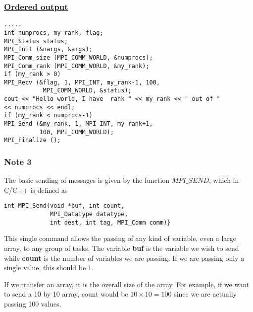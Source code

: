 \documentclass{beamer}
\begin{document}
\begin{frame}
\frametitle{\href{{https://github.com/CompPhysics/ComputationalPhysics2/blob/gh-pages/doc/Programs/LecturePrograms/programs/MPI/chapter07/program4.cpp}}{Ordered output}}

\begin{block}{}


\begin{Verbatim}[numbers=none,fontsize=\fontsize{9pt}{9pt},baselinestretch=0.95]
.....
int numprocs, my_rank, flag;
MPI_Status status;
MPI_Init (&nargs, &args);
MPI_Comm_size (MPI_COMM_WORLD, &numprocs);
MPI_Comm_rank (MPI_COMM_WORLD, &my_rank);
if (my_rank > 0)
MPI_Recv (&flag, 1, MPI_INT, my_rank-1, 100, 
           MPI_COMM_WORLD, &status);
cout << "Hello world, I have  rank " << my_rank << " out of " 
<< numprocs << endl;
if (my_rank < numprocs-1)
MPI_Send (&my_rank, 1, MPI_INT, my_rank+1, 
          100, MPI_COMM_WORLD);
MPI_Finalize ();
\end{Verbatim}

\end{block}
\end{frame}

\begin{frame}
\frametitle{Note 3}

\begin{block}{}


The basic sending of messages is given by the function $MPI\_SEND$, which in C/C++
is defined as 
\begin{verbatim}
int MPI_Send(void *buf, int count, 
             MPI_Datatype datatype, 
             int dest, int tag, MPI_Comm comm)}
\end{verbatim}
This single command allows the passing of any kind of variable, even a large array, to any group of tasks. 
The variable \textbf{buf} is the variable we wish to send while \textbf{count}
is the  number of variables we are passing. If we are passing only a single value, this should be 1. 

If we transfer an array, it is  the overall size of the array. 
For example, if we want to send a 10 by 10 array, count would be $10\times 10=100$ 
since we are  actually passing 100 values.  


\end{block}
\end{frame}
\end{document}
